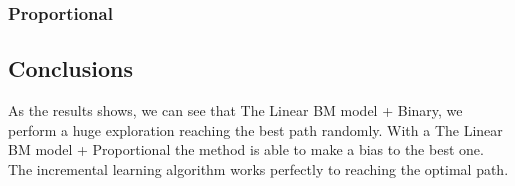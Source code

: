 \newpage
\subsubsection{Proportional}

\begin{figure}[ht]
\centering
{}
\label{fig:fig1}
\end{figure}







\newpage
\subsection{Conclusions}
As the results shows, we can see that The Linear BM model + Binary, we perform a huge exploration reaching the best path randomly. With a The Linear BM model + Proportional the method is able to make a bias to the best one. The incremental learning algorithm works perfectly to reaching the optimal path.